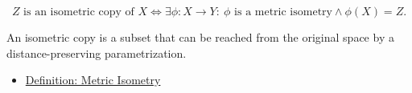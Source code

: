 \begin{remark*}
\[
Z\text{ is an isometric copy of }X
\Longleftrightarrow
\exists\phi:X\to Y{:}\ \phi\text{ is a metric isometry}
\land \phi(X)=Z.
\]
\end{remark*}

\begin{remark*}[Interpretation]
An isometric copy is a subset that can be reached from the original space by a
distance-preserving parametrization.
\end{remark*}


\begin{dependencies}
\begin{itemize}
  \item \hyperref[def:metric-isometry]{Definition: Metric Isometry}
\end{itemize}
\end{dependencies}
